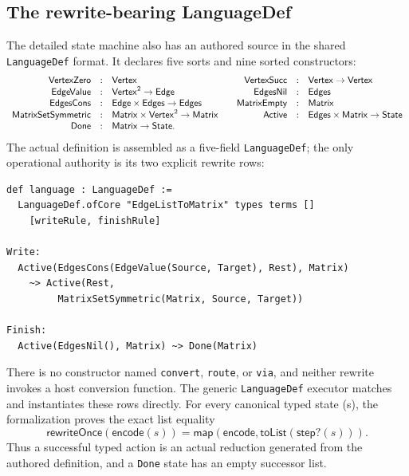 \documentclass[11pt]{article}
\theoremstyle{remark}
\newcommand{\code}[1]{\texttt{#1}}
\begin{document}
\subsection{The rewrite-bearing LanguageDef}
\label{sec:matrix-langdef}

The detailed state machine also has an authored source in the shared
\code{LanguageDef} format.  It declares five sorts and nine sorted
constructors:
\[
\begin{array}{rcl@{\qquad}rcl}
\mathsf{VertexZero}&:&\mathsf{Vertex} &
\mathsf{VertexSucc}&:&\mathsf{Vertex}\to\mathsf{Vertex}\\
\mathsf{EdgeValue}&:&\mathsf{Vertex}^2\to\mathsf{Edge} &
\mathsf{EdgesNil}&:&\mathsf{Edges}\\
\mathsf{EdgesCons}&:&\mathsf{Edge}\times\mathsf{Edges}\to\mathsf{Edges} &
\mathsf{MatrixEmpty}&:&\mathsf{Matrix}\\
\mathsf{MatrixSetSymmetric}&:&
  \mathsf{Matrix}\times\mathsf{Vertex}^2\to\mathsf{Matrix} &
\mathsf{Active}&:&\mathsf{Edges}\times\mathsf{Matrix}\to\mathsf{State}\\
\mathsf{Done}&:&\mathsf{Matrix}\to\mathsf{State}.&&
\end{array}
\]
The actual definition is assembled as a five-field \code{LanguageDef}; the
only operational authority is its two explicit rewrite rows:
\begin{lstlisting}[style=graphlang,language={}]
def language : LanguageDef :=
  LanguageDef.ofCore "EdgeListToMatrix" types terms []
    [writeRule, finishRule]

Write:
  Active(EdgesCons(EdgeValue(Source, Target), Rest), Matrix)
    ~> Active(Rest,
         MatrixSetSymmetric(Matrix, Source, Target))

Finish:
  Active(EdgesNil(), Matrix) ~> Done(Matrix)
\end{lstlisting}
There is no constructor named \code{convert}, \code{route}, or \code{via},
and neither rewrite invokes a host conversion function.  The generic
\code{LanguageDef} executor matches and instantiates these rows directly.
For every canonical typed state (s), the formalization proves the exact list
equality
\[
  \mathsf{rewriteOnce}(\mathsf{encode}(s))
  = \mathsf{map}(\mathsf{encode},\mathsf{toList}(\mathsf{step?}(s))).
\]
Thus a successful typed action is an actual reduction generated from the
authored definition, and a \code{Done} state has an empty successor list.
\end{document}
